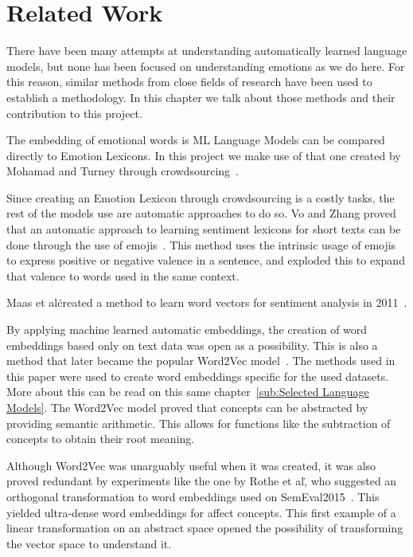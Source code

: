 \chapter{Related Work}\label{chap:Related Work}

There have been many attempts at understanding automatically learned language models, but none has been focused on understanding emotions as we do here. For this reason, similar methods from close fields of research have been used to establish a methodology. In this chapter we talk about those methods and their contribution to this project.

The embedding of emotional words is ML Language Models can be compared directly to Emotion Lexicons. In this project we make use of that one created by Mohamad and Turney through crowdsourcing~\cite{mohammad2013crowdsourcing}. %


Since creating an Emotion Lexicon through crowdsourcing is a costly tasks, the rest of the models use are automatic approaches to do so. Vo and Zhang proved that an automatic approach to learning sentiment lexicons for short texts can be done through the use of emojis~\cite{vo2016count}. This method uses the intrinsic usage of emojis to express positive or negative valence in a sentence, and exploded this to expand that valence to words used in the same context.

Maas et al\. created a method to learn word vectors for sentiment analysis in 2011~\cite{maas2011learning}.

By applying machine learned automatic embeddings, the creation of word embeddings based only on text data was open as a possibility. This is also a method that later became the popular Word2Vec model~\cite{mikolov2013word2vec}. The methods used in this paper were used to create word embeddings specific for the used datasets. More about this can be read on this same chapter~\ref{sub:Selected Language Models}. The Word2Vec model proved that concepts can be abstracted by providing semantic arithmetic. This allows for functions like the subtraction of concepts to obtain their root meaning.

Although Word2Vec was unarguably useful when it was created, it was also proved redundant by experiments like the one by Rothe et al\., who suggested an orthogonal transformation to word embeddings used on SemEval2015~\cite{rothe2016orthogonal}. This yielded ultra-dense word embeddings for affect concepts. This first example of a linear transformation on an abstract space opened the possibility of transforming the vector space to understand it.

